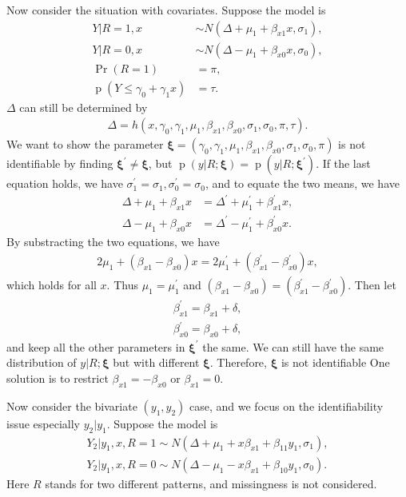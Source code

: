 \documentclass[12pt]{article}
\DeclareMathOperator{\pr}{p}
\DeclareMathOperator{\prob}{Pr}
\begin{document}
Now consider the situation with covariates. Suppose the model is
\begin{align*}
  Y | R = 1, x & \sim N(\Delta + \mu_1 + \beta_{x1} x , \sigma_1) ,\\
  Y | R = 0, x & \sim N(\Delta - \mu_1 + \beta_{x0} x, \sigma_0) ,\\
  \prob (R = 1) & = \pi ,\\
  \pr (Y \leq \gamma_0 + \gamma_1 x ) & = \tau.
\end{align*}
$\Delta$ can still be determined by
\begin{align*}
  \Delta = h(x, \gamma_0, \gamma_1, \mu_1, \beta_{x1}, \beta_{x0},
  \sigma_1, \sigma_0, \pi , \tau).
\end{align*}
We want to show the parameter $\bm \xi = (\gamma_0, \gamma_1, \mu_1,
\beta_{x1}, \beta_{x0}, \sigma_1, \sigma_0, \pi )$ is not identifiable
by finding $\bm \xi^{'} \neq \bm \xi$, but $\pr (y | R; \bm \xi) = \pr
(y | R; \bm \xi^{'})$. If the last equation holds, we have
$\sigma_1^{'} = \sigma_1, \sigma_0^{'} = \sigma_0$, and to equate the
two means, we have
\begin{align*}
  \Delta + \mu_1 + \beta_{x1} x & = \Delta^{'} + \mu_1^{'} + \beta_{x1}^{'}x ,\\
  \Delta - \mu_1 + \beta_{x0} x & = \Delta^{'} - \mu_1^{'} +
  \beta_{x0}^{'}x.
\end{align*}
By substracting the two equations, we have
\begin{align*}
  2\mu_1 + (\beta_{x1} - \beta_{x0}) x = 2\mu_1^{'} + (\beta_{x1}^{'}
  - \beta_{x0}^{'}) x,
\end{align*}
which holds for all $x$. Thus $\mu_1 = \mu_1^{'}$ and $(\beta_{x1} -
\beta_{x0}) = (\beta_{x1}^{'} - \beta_{x0}^{'})$. Then let
\begin{align*}
  \beta_{x1}^{'} =  \beta_{x1} + \delta, \\
  \beta_{x0}^{'} = \beta_{x0} + \delta,
\end{align*}
and keep all the other parameters in $\bm \xi^{'}$ the same. We can
still have the same distribution of $y|R; \bm \xi$ but with different
$\bm \xi$. Therefore, $\bm \xi$ is not identifiable One solution is to
restrict $\beta_{x1} = - \beta_{x0}$ or $\beta_{x1} = 0$.

Now consider the bivariate $(y_1, y_2)$ case, and we focus on the
identifiability issue especially $y_2|y_1$. Suppose the model is
\begin{align*}
  Y_2 | y_1, x, R = 1 \sim N(\Delta + \mu_1 + x\beta_{x1} + \beta_{11}y_1, \sigma_1), \\
  Y_2 | y_1, x, R = 0 \sim N(\Delta - \mu_1 - x\beta_{x1} +
  \beta_{10}y_1, \sigma_0).
\end{align*}
Here $R$ stands for two different patterns, and missingness is not
considered.
\end{document}
